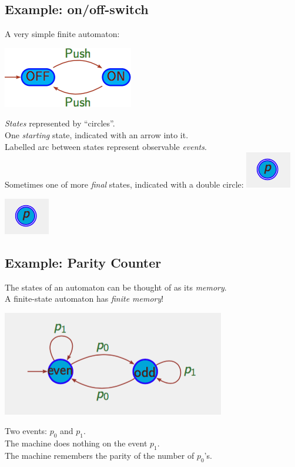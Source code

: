 \subsection{Example: on/off-switch}
\label{sub:Example: on/off-switch}
A very simple finite automaton:
\begin{center}
	\includegraphics[scale=0.5]{onOff.png}
\end{center}
{\color{red} \emph{States}} represented by ``circles''.\\
One {\color{red} \emph{starting}} state, indicated with an arrow into it.\\
Labelled arc between states represent observable {\color{red} \emph{events}}.\\
Sometimes one of more {\color{red} \emph{final}} states,
indicated with a double circle: \includegraphics[scale=0.5]{doubleCircle.png}
\begin{center}
	\includegraphics[scale=0.5]{doubleCircle.png}
\end{center}

\subsection{Example: Parity Counter}
\label{sub:Example: Parity Counter}
The states of an automaton can be thought of as its {\color{red} \emph{memory}}.\\
A finite-state automaton has {\color{red} \emph{finite memory}}!
\begin{center}
	\includegraphics[scale=0.5]{parityCounter.png}
\end{center}
Two events: $p_0$ and $p_1$.\\
The machine does nothing on the event $p_1$.\\
The machine remembers the parity of the number of $p_0$'s.\\
\smallskip

